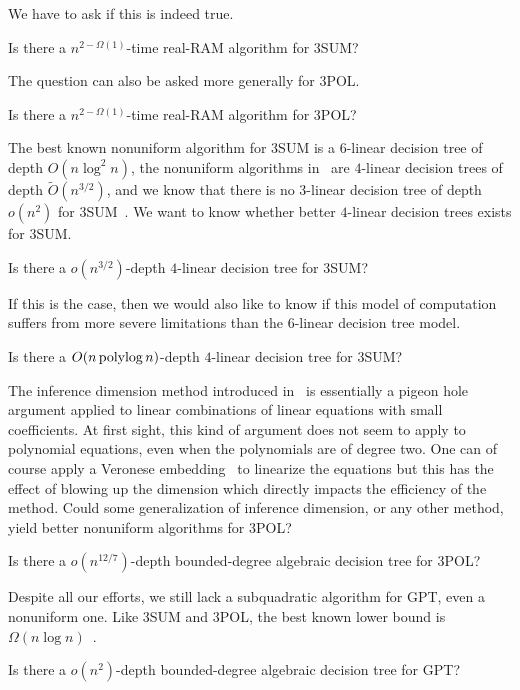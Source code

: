 We have to ask if this is indeed true.
\begin{openquestion}
	Is there a \(n^{2-\Omega(1)}\)-time real-RAM algorithm for 3SUM?
\end{openquestion}

The question can also be asked more generally for 3POL.
\begin{openquestion}
	Is there a \(n^{2-\Omega(1)}\)-time real-RAM algorithm for 3POL?
\end{openquestion}

The best known nonuniform algorithm for 3SUM is a \(6\)-linear decision tree of
depth \(O(n \log^2 n)\), the nonuniform algorithms in~\cite{GP18,Fr15,GS15} are
\(4\)-linear decision trees of depth \( \tilde{O}(n^{3/2}) \), and we know that
there is no \(3\)-linear decision tree of depth \(o(n^2)\) for
3SUM~\cite{Er99a}.
We want to know whether better \(4\)-linear decision trees exists for 3SUM.
\begin{openquestion}
	Is there a \(o(n^{3/2})\)-depth \(4\)-linear decision tree for 3SUM?
\end{openquestion}

If this is the case, then we would also like to know if this model of
computation suffers from more severe limitations than the \(6\)-linear decision tree
model.
\begin{openquestion}
	Is there a \(O(n \operatorname{polylog} n)\)-depth \(4\)-linear decision tree for 3SUM?
\end{openquestion}

The inference dimension method introduced in~\cite{KLM18} is essentially a
pigeon hole argument applied to linear combinations of linear equations with small coefficients.
At first sight, this kind of argument does not seem to apply to polynomial
equations, even when the polynomials are of degree two. One can of course apply
a Veronese embedding~\cite{Har77,Har13} to linearize the equations but this has
the effect of blowing up the dimension which directly impacts the efficiency of
the method. Could some generalization of inference dimension, or any other
method, yield better nonuniform algorithms for 3POL?
\begin{openquestion}
	Is there a \(o(n^{12/7})\)-depth bounded-degree algebraic decision tree for
	3POL?
\end{openquestion}

Despite all our efforts, we still lack a subquadratic algorithm for GPT, even a
nonuniform one. Like 3SUM and 3POL, the best known lower bound is \(\Omega(n
\log n)\)~\cite{???}.
\begin{openquestion}
	Is there a \(o(n^2)\)-depth bounded-degree algebraic decision tree for
	GPT?
\end{openquestion}

